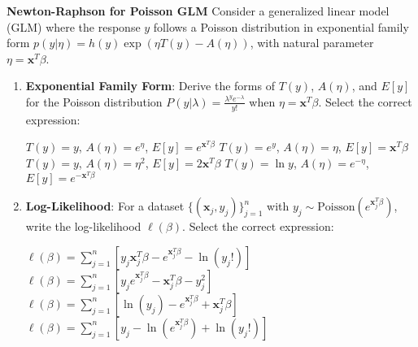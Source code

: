 \documentclass[12pt,letterpaper, onecolumn]{exam}
\begin{document}
\begin{questions}
\begin{solution}
\begin{parts}
        \part   
        \part   
        \part 
    \end{parts}
\end{solution}

\clearpage
\question[30 points]\textbf{Newton-Raphson for Poisson GLM}\droppoints
Consider a generalized linear model (GLM) where the response \( y \) follows a Poisson distribution in exponential family form \( p(y | \eta) = h(y) \exp(\eta T(y) - A(\eta)) \), with natural parameter \( \eta = \mathbf{x}^T \beta \).

\begin{enumerate}[label=(\alph*)]
    \item \textbf{Exponential Family Form}: Derive the forms of \( T(y) \), \( A(\eta) \), and \( E[y] \) for the Poisson distribution \( P(y | \lambda) = \frac{\lambda^y e^{-\lambda}}{y!} \) when \( \eta = \mathbf{x}^T \beta \). Select the correct expression:
    \begin{choices}
        \choice \( T(y) = y \), \( A(\eta) = e^\eta \), \( E[y] = e^{\mathbf{x}^T \beta} \)
        \choice \( T(y) = e^y \), \( A(\eta) = \eta \), \( E[y] = \mathbf{x}^T \beta \)
        \choice \( T(y) = y \), \( A(\eta) = \eta^2 \), \( E[y] = 2\mathbf{x}^T \beta \)
        \choice \( T(y) = \ln y \), \( A(\eta) = e^{-\eta} \), \( E[y] = e^{-\mathbf{x}^T \beta} \)
    \end{choices}

    \item \textbf{Log-Likelihood}: For a dataset \( \{(\mathbf{x}_j, y_j)\}_{j=1}^n \) with \( y_j \sim \text{Poisson}(e^{\mathbf{x}_j^T \beta}) \), write the log-likelihood \( \ell(\beta) \). Select the correct expression:
    \begin{choices}
        \choice \( \ell(\beta) = \sum_{j=1}^n [ y_j \mathbf{x}_j^T \beta - e^{\mathbf{x}_j^T \beta} - \ln(y_j!) ] \)
        \choice \( \ell(\beta) = \sum_{j=1}^n [ y_j e^{\mathbf{x}_j^T \beta} - \mathbf{x}_j^T \beta - y_j^2 ] \)
        \choice \( \ell(\beta) = \sum_{j=1}^n [ \ln(y_j) - e^{\mathbf{x}_j^T \beta} + \mathbf{x}_j^T \beta ] \)
        \choice \( \ell(\beta) = \sum_{j=1}^n [ y_j - \ln(e^{\mathbf{x}_j^T \beta}) + \ln(y_j!) ] \)
    \end{choices}


\end{enumerate}
\end{questions}
\end{document}
